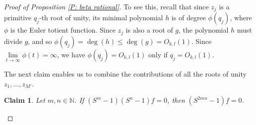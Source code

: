 \documentclass[11pt]{amsart}
\newtheorem{claim}[lemma]{Claim}
\theoremstyle{definition}
\newcommand{\1}{{\mathbf{1}}}
\begin{document}
\begin{proof}[Proof of Proposition \ref{P: beta rational}]
 To see this, recall that since  $z_j$ is a primitive $q_j$-th root of unity, its minimal polynomial $h$ is of degree $\phi(q_{j})$, where $\phi$ is the Euler totient function. Since $z_{j}$ is also a root of $g$, the polynomial $h$ must divide $g$, and so $\phi(q_{j})=\deg(h)\leq \deg(g)=O_{k,l}(1)$. Since $\lim\limits_{t\to\infty}\phi(t)=\infty$, we have $\phi(q_{j})=O_{k,l}(1)$ only if $q_{j}=O_{k,l}(1)$.
 
 

 

The next claim enables us to combine the contributions of all the roots of unity $z_1, \ldots, z_{M'}$.

\begin{claim}\label{Claim 4}
Let $m,n\in\mathbb{N}$. If $(S^{m}-1)(S^{n}-1)f=0$, then $(S^{2mn}-1)f=0$.    
\end{claim}


\end{proof}
\end{document}
